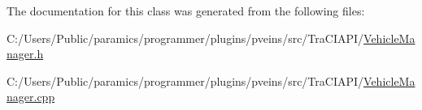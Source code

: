 The documentation for this class was generated from the following files\+:\begin{DoxyCompactItemize}
\item 
C\+:/\+Users/\+Public/paramics/programmer/plugins/pveins/src/\+Tra\+C\+I\+A\+P\+I/\hyperlink{_vehicle_manager_8h}{Vehicle\+Manager.\+h}\item 
C\+:/\+Users/\+Public/paramics/programmer/plugins/pveins/src/\+Tra\+C\+I\+A\+P\+I/\hyperlink{_vehicle_manager_8cpp}{Vehicle\+Manager.\+cpp}\end{DoxyCompactItemize}
